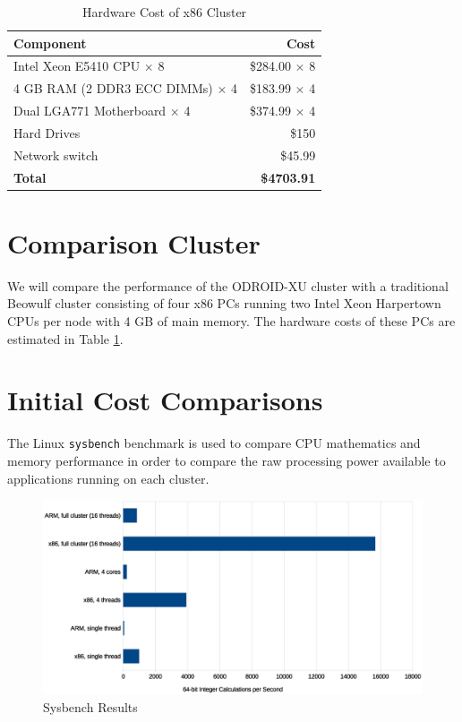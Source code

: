 \documentclass[11pt]{book}
\begin{document}
\begin{table}
  \caption{Hardware Cost of x86 Cluster}\label{x86-cost-table}
  \centering
  \begin{tabular}{| l | r |}
    \hline
    \textbf{Component} & \textbf{Cost} \\
    \hline
    Intel Xeon E5410 CPU $\times$ 8 & \$284.00 $\times$ 8 \\
    4 GB RAM (2 DDR3 ECC DIMMs) $\times$ 4 & \$183.99 $\times$ 4 \\
    Dual LGA771 Motherboard $\times$ 4 & \$374.99 $\times$ 4 \\
    Hard Drives & \$150 \\
    Network switch & \$45.99 \\
    \hline
    \textbf{Total} & \textbf{\$4703.91} \\ \hline
  \end{tabular}
\end{table}

\section{Comparison Cluster}

We will compare the performance of the ODROID-XU cluster with a traditional Beowulf
cluster consisting of four x86 PCs running two Intel Xeon Harpertown CPUs per node with 4 GB of main memory.
The hardware costs of these PCs are estimated in Table \ref{x86-cost-table}.

\section{Initial Cost Comparisons}

The Linux \verb;sysbench; benchmark is used to compare CPU mathematics and memory
performance in order to compare the raw processing power available to applications running
on each cluster.

\begin{figure}
\centering
\includegraphics[width=\textwidth]{sysbench_all}
\caption{Sysbench Results}
\label{sysbench-all}
\end{figure}
\end{document}
